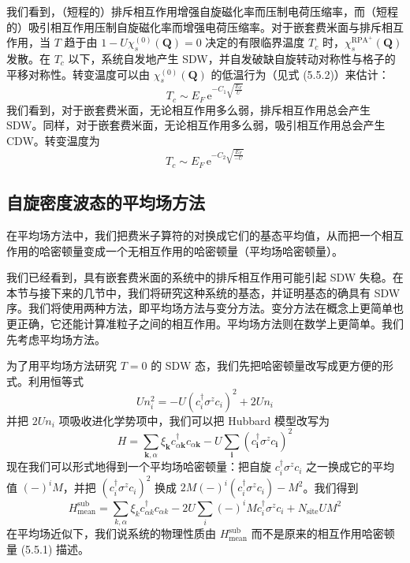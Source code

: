 我们看到，（短程的）排斥相互作用增强自旋磁化率而压制电荷压缩率，而（短程的）吸引相互作用压制自旋磁化率而增强电荷压缩率。对于嵌套费米面与排斥相互作用，当 $T$ 趋于由 $1-U\chi^{(0)}_{s}(\pmb{Q})=0$ 决定的有限临界温度 $T_{c}$ 时，$\chi^{\mathrm{RPA}^{+}}_{s}(\pmb{Q})$ 发散。在 $T_{c}$ 以下，系统自发地产生 SDW，并自发破缺自旋转动对称性与格子的平移对称性。转变温度可以由 $\chi^{(0)}_{s}(\pmb{Q})$ 的低温行为（见式 (5.5.2)）来估计：
\begin{equation*}
T_{c}\sim E_{F}\,\mathrm{e}^{-C_{1}\sqrt{\frac{E_{F}}{U}}}
\end{equation*}
我们看到，对于嵌套费米面，无论相互作用多么弱，排斥相互作用总会产生 SDW。同样，对于嵌套费米面，无论相互作用多么弱，吸引相互作用总会产生 CDW。转变温度为
\begin{equation*}
T_{c}\sim E_{F}\,\mathrm{e}^{-C_{2}\sqrt{\frac{E_{F}}{-U}}}
\end{equation*}

\subsection{自旋密度波态的平均场方法}

\begin{keypoints}
\item 在平均场方法中，我们把费米子算符的对换成它们的基态平均值，从而把一个相互作用的哈密顿量变成一个无相互作用的哈密顿量（平均场哈密顿量）。
\end{keypoints}

我们已经看到，具有嵌套费米面的系统中的排斥相互作用可能引起 SDW 失稳。在本节与接下来的几节中，我们将研究这种系统的基态，并证明基态的确具有 SDW 序。我们将使用两种方法，即平均场方法与变分方法。变分方法在概念上更简单也更正确，它还能计算准粒子之间的相互作用。平均场方法则在数学上更简单。我们先考虑平均场方法。


为了用平均场方法研究 $T=0$ 的 SDW 态，我们先把哈密顿量改写成更方便的形式。利用恒等式
\begin{equation*}
Un^{2}_{i}=-U(c^{\dagger}_{i}\sigma^{z}c_{i})^{2}+2Un_{i}
\end{equation*}
并把 $2Un_{i}$ 项吸收进化学势项中，我们可以把 Hubbard 模型改写为
\begin{equation*}
H=\sum_{\pmb{k},\alpha}\xi_{\pmb{k}}c^{\dagger}_{\alpha\pmb{k}}c_{\alpha\pmb{k}}-U\sum_{\pmb{i}}(c^{\dagger}_{\pmb{i}}\sigma^{z}c_{\pmb{i}})^{2}
\end{equation*}
现在我们可以形式地得到一个平均场哈密顿量：把自旋 $c^{\dagger}_{i}\sigma^{z}c_{i}$ 之一换成它的平均值 $(-)^{i}M$，并把 $(c^{\dagger}_{i}\sigma^{z}c_{i})^{2}$ 换成 $2M(-)^{i}(c^{\dagger}_{i}\sigma^{z}c_{i})-M^{2}$。我们得到
\begin{equation*}
H^{\mathrm{sub}}_{\mathrm{mean}}=\sum_{k,\alpha}\xi_{k}c^{\dagger}_{\alpha k}c_{\alpha k}-2U\sum_{i}(-)^{i}Mc^{\dagger}_{i}\sigma^{z}c_{i}+N_{\mathrm{site}}UM^{2}
\end{equation*}
在平均场近似下，我们说系统的物理性质由 $H^{\mathrm{sub}}_{\mathrm{mean}}$ 而不是原来的相互作用哈密顿量 (5.5.1) 描述。

